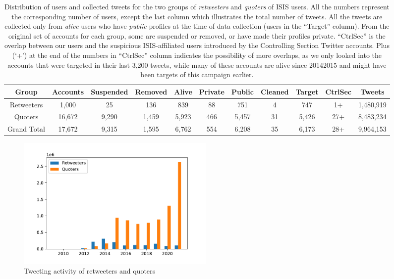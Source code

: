 \documentclass[letterpaper]{article} %
\begin{document}
\begin{table}[ht]
\centering
\begin{tabular}{|c||c|c|c|c|c|c|c|c|c|c|} 
 \hline
 Group & Accounts & Suspended & Removed & Alive & Private & Public & Cleaned & Target & CtrlSec & Tweets\\ [0.5ex] 
 \hline\hline
  Retweeters & 1,000 & 25 & 136 & 839 & 88 & 751 & 4 & 747 & 1+ & 1,480,919 \\\hline 
 Quoters & 16,672 & 9,290 & 1,459 & 5,923 & 466 & 5,457 & 31 & 5,426 & 27+ & 8,483,234\\[0.25ex]\hline
Grand Total & 17,672 & 9,315 & 1,595 & 6,762 & 554 & 6,208 & 35 & 6,173 & 28+ & 9,964,153 \\[0.25ex]\hline
\end{tabular}
\caption{Distribution of users and collected tweets for the two groups of \textit{retweeters} and \textit{quoters} of ISIS users. All the numbers represent the corresponding number of users, except the last column which illustrates the total number of tweets. All the tweets are collected only from \textit{alive} users who have \textit{public} profiles at the time of data collection (users in the ``Target'' column). From the original set of accounts for each group, some are suspended or removed, or have made their profiles private. ``CtrlSec'' is the overlap between our users and the suspicious ISIS-affiliated users introduced by the Controlling Section Twitter accounts. Plus (`+') at the end of the numbers in ``CtrlSec'' column indicates the possibility of more overlaps, as we only looked into the accounts that were targeted in their last 3,200 tweets, while many of these accounts are alive since 20142015 and might have been targets of this campaign earlier.}
\label{table:users}
\end{table}

\begin{figure}[ht]
\includegraphics[width=0.47\textwidth]{img/overall-activity.pdf}
\caption{Tweeting activity of retweeters and quoters}
\label{fig:tweeting-activity}
\end{figure}
\end{document}
